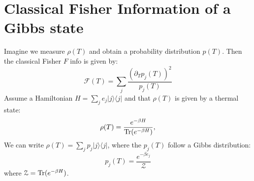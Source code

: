 \section{Classical Fisher Information of a Gibbs state}\label{Classical Fisher Gibbs}
Imagine we measure $\rho(T)$ and obtain a probability distribution $p(T)$. Then the classical Fisher $F$ info is given by:
\begin{equation}
\mathcal{F}(T) = \sum_j \frac{(\partial_T p_j(T))^2}{p_j(T)}
\label{CFisher}
\end{equation}
Assume a Hamiltonian $H=\sum_j e_j |j \rangle \langle j| $ and that $\rho(T)$ is given by a thermal state:
\begin{equation}
\rho(T) = \frac{e^{-\beta H}}{{\rm Tr}(e^{-\beta H})},
\end{equation}
We can write $\rho(T)= \sum_j p_j  |j \rangle \langle j|$, where the $p_j(T)$ follow a Gibbs distribution:
\begin{equation}
    p_j(T) = \frac{e^{-\beta e_j}}{\mathcal{Z}}
\end{equation}
where $\mathcal{Z}= {\rm Tr}(e^{-\beta H})$.

